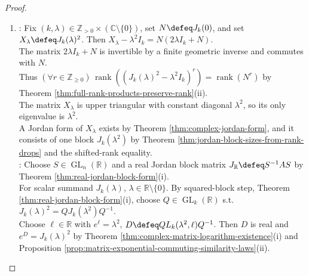 \begin{proposition}
\begin{proof}
\begin{enumerate}[label=(\roman*)]
Then $L_k(\lambda,\ell)$ is real, and $e^{L_k(\lambda,\ell)}=J_k(\lambda)$ by Theorem \ref{thm:complex-matrix-logarithm-existence}(i).\\
For a summand $\mathcal{J}_k(a,b)$, set $\lambda\defeq a+ib$, choose $\ell\in\mathbb{C}$ with $e^{\ell}=\lambda$, and set $D\defeq L_k(\lambda,\ell)$.\\
Then $e^{\mathfrak{R}(D)}=\mathfrak{R}(J_k(\lambda))=\mathcal{J}_k(a,b)$ by the realification identities and Theorem \ref{thm:complex-matrix-logarithm-existence}(i).\\
Let $L_{\mathbb{R}}$ be the direct sum of these real block logarithms and set $B\defeq SL_{\mathbb{R}}S^{-1}$.\\
Then $e^B=S e^{L_{\mathbb{R}}}S^{-1}=SJ_{\mathbb{R}}S^{-1}=A$ by Proposition \ref{prop:matrix-exponential-commuting-similarity-laws}(ii), exponential partial sums, and entrywise limits.
\item {}: Fix $(k,\lambda)\in\mathbb{Z}_{>0}\times(\mathbb{C}\setminus\{0\})$, set $N\defeq J_k(0)$, and set $X_{\lambda}\defeq J_k(\lambda)^2$. Then $X_{\lambda}-\lambda^2I_k=N(2\lambda I_k+N)$.\\
The matrix $2\lambda I_k+N$ is invertible by a finite geometric inverse and commutes with $N$.\\
Thus $(\forall r\in\mathbb{Z}_{\geq0})\,\operatorname{rank}((J_k(\lambda)^2-\lambda^2I_k)^r)=\operatorname{rank}(N^r)$ by Theorem \ref{thm:full-rank-products-preserve-rank}(ii).\\
The matrix $X_{\lambda}$ is upper triangular with constant diagonal $\lambda^2$, so its only eigenvalue is $\lambda^2$.\\
A Jordan form of $X_{\lambda}$ exists by Theorem \ref{thm:complex-jordan-form}, and it consists of one block $J_k(\lambda^2)$ by Theorem \ref{thm:jordan-block-sizes-from-rank-drops} and the shifted-rank equality.\\
: Choose $S\in\operatorname{GL}_n(\mathbb{R})$ and a real Jordan block matrix $J_{\mathbb{R}}\defeq S^{-1}AS$ by Theorem \ref{thm:real-jordan-block-form}(i).\\
For scalar summand $J_k(\lambda)$, $\lambda\in\mathbb{R}\setminus\{0\}$. By squared-block step, Theorem \ref{thm:real-jordan-block-form}(i), choose $Q\in\operatorname{GL}_k(\mathbb{R})$ s.t. $J_k(\lambda)^2=QJ_k(\lambda^2)Q^{-1}$.\\
Choose $\ell\in\mathbb{R}$ with $e^{\ell}=\lambda^2$, $D\defeq QL_k(\lambda^2,\ell)Q^{-1}$. Then $D$ is real and $e^D=J_k(\lambda)^2$ by Theorem \ref{thm:complex-matrix-logarithm-existence}(i) and Proposition \ref{prop:matrix-exponential-commuting-similarity-laws}(ii).\\

\end{enumerate}
\end{proof}
\end{proposition}
